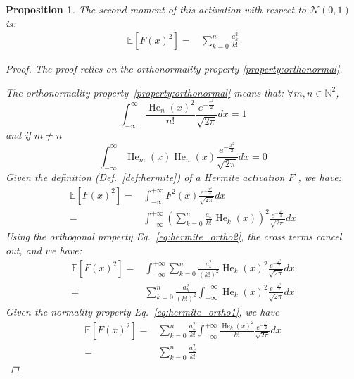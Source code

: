 \documentclass{article} %
\theoremstyle{plain}
\newtheorem{proposition}[theorem]{Proposition}
\theoremstyle{definition}
\theoremstyle{remark}
\begin{document}
\begin{proposition}
\label{prop:hermite_forward_gain}
The second moment of this activation with respect to $\mathcal{N}(0,1)$ is:
\begin{align}
\label{eq:hermite_final}
\mathbb{E}\left[F(x)^2\right]=&\sum^{n}_{k=0} \frac{a_k^2}{k!}
\end{align}
\begin{proof}
    The proof relies on the orthonormality property \ref{property:orthonormal}.
    
    The orthonormality property~\ref{property:orthonormal} means that:
$\forall m,n \in \mathbb{N}^2$,
    \begin{equation}
    \label{eq:hermite_ortho1}
    \int_{-\infty}^{\infty} \frac{\operatorname{He}_n(x)^2}{n!} \frac{e^{-\frac{x^2}{2}}}{\sqrt{2\pi}} d x=1
\end{equation}
and if $m \neq n $
\begin{equation}
    \label{eq:hermite_ortho2}
    \int_{-\infty}^{\infty} \operatorname{He}_m(x) \operatorname{He}_n(x) \frac{e^{-\frac{x^2}{2}}}{\sqrt{2\pi}} d x=0
\end{equation}
Given the definition (Def.~\ref{def:hermite}) of a Hermite activation $F$ , we have:
\begin{align}
\mathbb{E}\left[F(x)^2\right]=&\int_{-\infty}^{+\infty} F^2(x) \frac{e^{-\frac{x^2}{2}}}{\sqrt{2\pi}} d x \\
=&\int_{-\infty}^{+\infty}\left(\sum^{n}_{k=0} \frac{a_k}{k!}\operatorname{He}_k(x)\right)^2  \frac{e^{-\frac{x^2}{2}}}{\sqrt{2\pi}} d x
\end{align}
Using the orthogonal property Eq.~\ref{eq:hermite_ortho2}, the cross terms cancel out, and we have:
\begin{align}
\mathbb{E}\left[F(x)^2\right]=&\int_{-\infty}^{+\infty}\sum^{n}_{k=0} \frac{a_k^2}{(k!)^2}\operatorname{He}_k(x)^2  \frac{e^{-\frac{x^2}{2}}}{\sqrt{2\pi}} d x\\
=&\sum^{n}_{k=0} \frac{a_k^2}{(k!)^2}\int_{-\infty}^{+\infty}\operatorname{He}_k(x)^2  \frac{e^{-\frac{x^2}{2}}}{\sqrt{2\pi}} d x
\end{align}
Given the normality property Eq.~\ref{eq:hermite_ortho1}, we have
\begin{align}
\mathbb{E}\left[F(x)^2\right]=&\sum^{n}_{k=0} \frac{a_k^2}{k!}\int_{-\infty}^{+\infty}\frac{\operatorname{He}_k(x)^2}{k!}\frac{e^{-\frac{x^2}{2}}}{\sqrt{2\pi}} d x\\
=&\sum^{n}_{k=0} \frac{a_k^2}{k!}
\end{align}
\end{proof}
\end{proposition}
\end{document}
